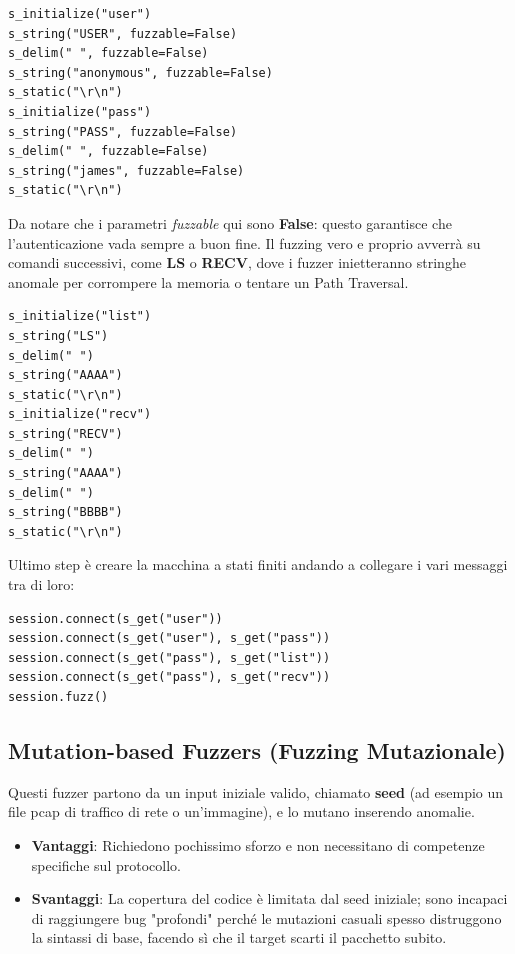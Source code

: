 \begin{lstlisting}
s_initialize("user")
s_string("USER", fuzzable=False)
s_delim(" ", fuzzable=False)
s_string("anonymous", fuzzable=False)
s_static("\r\n")
s_initialize("pass")
s_string("PASS", fuzzable=False)
s_delim(" ", fuzzable=False)
s_string("james", fuzzable=False)
s_static("\r\n")
\end{lstlisting}

Da notare che i parametri \textit{fuzzable} qui sono \textbf{False}: questo garantisce 
che l'autenticazione vada sempre a buon fine. Il fuzzing vero e proprio avverrà su 
comandi successivi, come \textbf{LS} o \textbf{RECV}, dove i fuzzer inietteranno 
stringhe anomale per corrompere la memoria o tentare un Path Traversal.

\begin{lstlisting}
s_initialize("list")
s_string("LS")
s_delim(" ")
s_string("AAAA")
s_static("\r\n")
s_initialize("recv")
s_string("RECV")
s_delim(" ")
s_string("AAAA")
s_delim(" ")
s_string("BBBB")
s_static("\r\n")
\end{lstlisting}

Ultimo step è creare la macchina a stati finiti andando a collegare i vari messaggi 
tra di loro:

\begin{lstlisting}
session.connect(s_get("user"))
session.connect(s_get("user"), s_get("pass"))
session.connect(s_get("pass"), s_get("list"))
session.connect(s_get("pass"), s_get("recv"))
session.fuzz()
\end{lstlisting}

\subsection{Mutation-based Fuzzers (Fuzzing Mutazionale)}

Questi fuzzer partono da un input iniziale valido, chiamato \textbf{seed} (ad esempio 
un file pcap di traffico di rete o un'immagine), e lo mutano inserendo anomalie.

\begin{itemize}
    \item \textbf{Vantaggi}: Richiedono pochissimo sforzo e non necessitano di competenze specifiche sul protocollo.
    \item \textbf{Svantaggi}: La copertura del codice è limitata dal seed iniziale; 
    sono incapaci di raggiungere bug "profondi" perché le mutazioni casuali spesso 
    distruggono la sintassi di base, facendo sì che il target scarti il pacchetto 
    subito.
\end{itemize}

